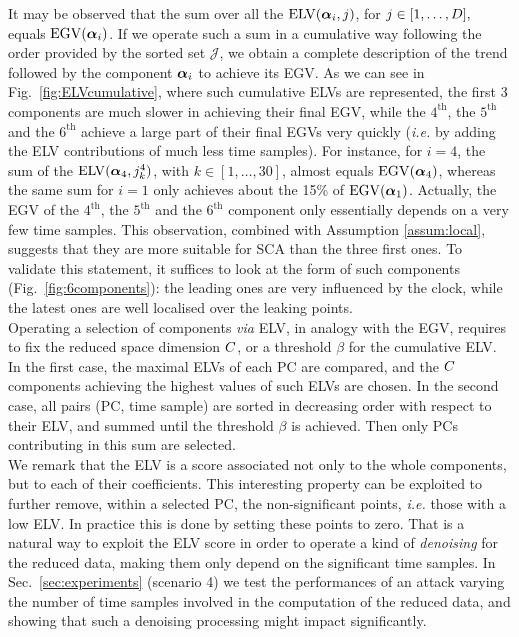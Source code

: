 It may be observed that the sum over all the $\mathrm{ELV}(\boldsymbol\alpha_i,j)$, for $j\in[1,\dots,D],$   equals $\mathrm{EGV}(\boldsymbol\alpha_i)$. If we operate such a sum in a cumulative way following the order provided by the sorted set $\mathcal{J}$, we obtain a complete description of the trend followed by the component $\boldsymbol\alpha_i$ to achieve its EGV. As we can see in Fig.~\ref{fig:ELVcumulative}, where such cumulative ELVs are represented, the first 3 components are much slower in achieving their final EGV, while the $4^\text{th}$, the $5^\text{th}$ and the $6^\text{th}$ achieve a large part of their final EGVs very quickly ({\em i.e.} by adding the ELV contributions of much less time samples). For instance, for $i=4$, the sum of the $\mathrm{ELV}(\boldsymbol\alpha_4, j^4_k)$, with $k\in[1,\dots,30]$, almost equals $\mathrm{EGV}(\boldsymbol\alpha_4)$, whereas the same sum for $i=1$ only achieves about the 15\% of $\mathrm{EGV}(\boldsymbol\alpha_1)$. Actually, the EGV of the $4^\text{th}$, the $5^\text{th}$ and the $6^\text{th}$ component only essentially depends on a very few time samples. This observation, combined with Assumption \ref{assum:local}, suggests that they are more suitable for SCA than the three first ones. To validate this statement, it suffices to look at the form of such components (Fig.~\ref{fig:6components}): the leading ones are very influenced by the clock, while the latest ones are well localised over the leaking points.\\

Operating a selection of components {\em via} ELV, in analogy with the EGV, requires to fix the reduced space dimension $C$, or a threshold $\beta$ for the cumulative ELV. In the first case, the maximal ELVs of each PC are compared, and the $C$ components achieving the highest values of such ELVs are chosen. In the second case, all pairs (PC, time sample) are sorted in decreasing order with respect to their ELV, and summed until the threshold $\beta$ is achieved. Then only PCs contributing in this sum are selected. \\

We remark that the ELV is a score associated not only to the whole components, but to each of their coefficients. This interesting property can be exploited to further remove, within a selected PC, the non-significant points, {\em i.e.} those with a low ELV. In practice this is done by setting these points to zero. That is a natural way to exploit the ELV score in order to operate a kind of {\em denoising} for the reduced data, making them only depend  on the significant time samples. In Sec.~\ref{sec:experiments} (scenario 4) we test the performances of an attack varying the number of time samples involved in the computation of the reduced data, and showing that such a denoising processing might impact significantly. 
 


